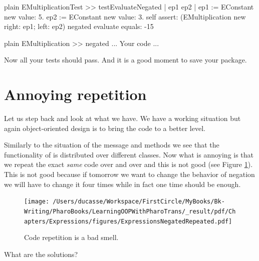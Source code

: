 \documentclass[10pt,twoside,english]{_support/latex/sbabook/sbabook}
\begin{document}
\begin{displaycode}{plain}
EMultiplicationTest >> testEvaluateNegated
	| ep1 ep2 |
	ep1 := EConstant new value: 5.
	ep2 := EConstant new value: 3.
	self assert: (EMultiplication new right: ep1; left: ep2) negated evaluate equals: -15
\end{displaycode}

\begin{displaycode}{plain}
EMultiplication >> negated
	... Your code ...
\end{displaycode}

Now all your tests should pass. And it is a good moment to save your package. 
\section{Annoying repetition}
Let us step back and look at what we have. We have a working situation but again object-oriented design is to bring the code to a better level. 

Similarly to the situation of the  message and methods we see that the functionality of  is distributed over 
different classes. Now what is annoying is that we repeat the exact \textit{same} code over and over and this is not good (see Figure \ref{fig:ExpressionsNegatedRepeated}). 
This is not good because if tomorrow we want to change the behavior of negation we will have to change it four times while 
in fact one time should be enough. 


\begin{figure}

\begin{center}
\texttt{[image: /Users/ducasse/Workspace/FirstCircle/MyBooks/Bk-Writing/PharoBooks/LearningOOPWithPharoTrans/\_result/pdf/Chapters/Expressions/figures/ExpressionsNegatedRepeated.pdf]}\caption{Code repetition is a bad smell.\label{fig:ExpressionsNegatedRepeated}}\end{center}
\end{figure}


What are the solutions?
\end{document}
